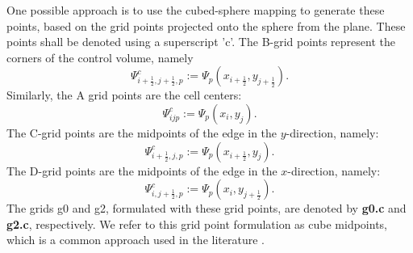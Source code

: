 One possible approach is to use the cubed-sphere mapping to generate these points, based on the grid points projected onto the sphere from the plane.
These points shall be denoted using a superscript 'c'.
The B-grid points represent the corners of the control volume, namely
\begin{equation}
	\Psi_{i+\frac{1}{2},j+\frac{1}{2},p}^c := \Psi_p(x_{i+\frac{1}{2}},y_{j+\frac{1}{2}}).
\end{equation}
Similarly, the A grid points are the cell centers:
\begin{equation}
	\Psi_{ijp}^c := \Psi_p(x_{i},y_{j}).
\end{equation}
The C-grid points are the midpoints of the edge in the $y$-direction, namely:
\begin{equation}
	\Psi_{i+\frac{1}{2},j,p}^c := \Psi_p(x_{i+\frac{1}{2}},y_{j}).
\end{equation}
The D-grid points are the midpoints of the edge in the $x$-direction, namely:
\begin{equation}
	\Psi_{i,j+\frac{1}{2},p}^c := \Psi_p(x_{i},y_{j+\frac{1}{2}}).
\end{equation}
The grids g0 and g2, formulated with these grid points, are denoted by \textbf{g0.c} and \textbf{g2.c}, respectively.
We refer to this grid point formulation as cube midpoints, which is a common approach used in the literature \citep{guo:2014,katta:2015,katta:2015b,nair:2005,ullrich:2016}.

